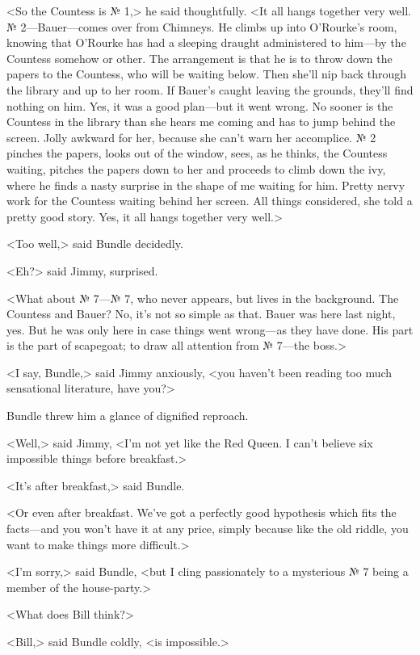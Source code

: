<So the Countess is № 1,> he said thoughtfully. <It all hangs together very well. № 2—Bauer—comes over from Chimneys. He climbs up into O'Rourke's room, knowing that O'Rourke has had a sleeping draught administered to him—by the Countess somehow or other. The arrangement is that he is to throw down the papers to the Countess, who will be waiting below. Then she'll nip back through the library and up to her room. If Bauer's caught leaving the grounds, they'll find nothing on him. Yes, it was a good plan—but it went wrong. No sooner is the Countess in the library than she hears me coming and has to jump behind the screen. Jolly awkward for her, because she can't warn her accomplice. № 2 pinches the papers, looks out of the window, sees, as he thinks, the Countess waiting, pitches the papers down to her and proceeds to climb down the ivy, where he finds a nasty surprise in the shape of me waiting for him. Pretty nervy work for the Countess waiting behind her screen. All things considered, she told a pretty good story. Yes, it all hangs together very well.>

<Too well,> said Bundle decidedly.

<Eh?> said Jimmy, surprised.

<What about № 7—№ 7, who never appears, but lives in the background. The Countess and Bauer? No, it's not so simple as that. Bauer was here last night, yes. But he was only here in case things went wrong—as they have done. His part is the part of scapegoat; to draw all attention from № 7—the boss.>

<I say, Bundle,> said Jimmy anxiously, <you haven't been reading too much sensational literature, have you?>

Bundle threw him a glance of dignified reproach.

<Well,> said Jimmy, <I'm not yet like the Red Queen. I can't believe six impossible things before breakfast.>

<It's after breakfast,> said Bundle.

<Or even after breakfast. We've got a perfectly good hypothesis which fits the facts—and you won't have it at any price, simply because like the old riddle, you want to make things more difficult.>

<I'm sorry,> said Bundle, <but I cling passionately to a mysterious № 7 being a member of the house-party.>

<What does Bill think?>

<Bill,> said Bundle coldly, <is impossible.>

